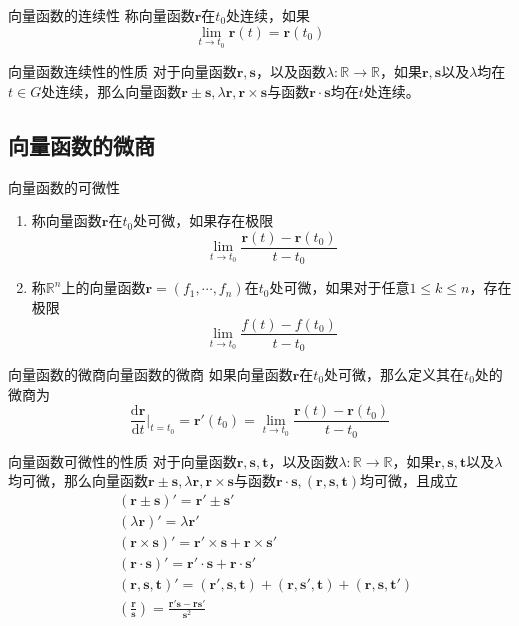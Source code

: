 \documentclass[lang = cn, scheme = chinese, thmcnt = section]{elegantbook}
\newcommand{\R}{\mathbb{R}}            %
\newcommand{\bs}{\boldsymbol}          %
\newcommand{\dd}{\mathrm{d}}           %
\begin{document}
\begin{definition}{向量函数的连续性}
	称向量函数$\bs{r}$在$t_0$处连续，如果
	$$
	\lim_{t\to t_0}\bs{r}(t)=\bs{r}(t_0)
	$$
\end{definition}

\begin{proposition}{向量函数连续性的性质}
	对于向量函数$\bs{r},\bs{s}$，以及函数$\lambda:\R\to\R$，如果$\bs{r},\bs{s}$以及$\lambda$均在$t\in G$处连续，那么向量函数$\bs{r}\pm\bs{s},\lambda \bs{r},\bs{r}\times\bs{s}$与函数$\bs{r}\cdot\bs{s}$均在$t$处连续。
\end{proposition}

\subsection{向量函数的微商}

\begin{definition}{向量函数的可微性}
	\begin{enumerate}
		\item 称向量函数$\bs{r}$在$t_0$处可微，如果存在极限
		$$
		\lim_{t\to t_0}\frac{\bs{r}(t)-\bs{r}(t_0)}{t-t_0}
		$$
		\item 称$\R^n$上的向量函数$\bs{r}=(f_1,\cdots,f_n)$在$t_0$处可微，如果对于任意$1\le k \le n$，存在极限
		$$
		\lim_{t\to t_0}\frac{f(t)-f(t_0)}{t-t_0}
		$$
	\end{enumerate}
\end{definition}

\begin{definition}{向量函数的微商}{向量函数的微商}
	如果向量函数$\bs{r}$在$t_0$处可微，那么定义其在$t_0$处的微商为
	$$
	\frac{\dd \bs{r}}{\dd t}\bigg|_{t=t_0}
	=\bs{r}'(t_0)
	=\lim_{t\to t_0}\frac{\bs{r}(t)-\bs{r}(t_0)}{t-t_0}
	$$
\end{definition}

\begin{proposition}{向量函数可微性的性质}
	对于向量函数$\bs{r},\bs{s},\bs{t}$，以及函数$\lambda:\R\to\R$，如果$\bs{r},\bs{s},\bs{t}$以及$\lambda$均可微，那么向量函数$\bs{r}\pm\bs{s},\lambda \bs{r},\bs{r}\times\bs{s}$与函数$\bs{r}\cdot\bs{s},(\bs{r},\bs{s},\bs{t})$均可微，且成立
	\begin{align*}
		& (\bs{r}\pm\bs{s})'=\bs{r}'\pm\bs{s}'\\
		& (\lambda \bs{r})'=\lambda \bs{r}'\\
		& (\bs{r}\times\bs{s})'=\bs{r}'\times\bs{s}+\bs{r}\times\bs{s}'\\
		& (\bs{r}\cdot\bs{s})'=\bs{r}'\cdot\bs{s}+\bs{r}\cdot\bs{s}'\\
		& (\bs{r},\bs{s},\bs{t})'=(\bs{r}',\bs{s},\bs{t})+(\bs{r},\bs{s}',\bs{t})+(\bs{r},\bs{s},\bs{t}')\\
		& \left(\frac{\bs{r}}{\bs{s}}\right)=\frac{\bs{r}'\bs{s}-\bs{r}\bs{s}'}{\bs{s}^2}
	\end{align*}
\end{proposition}
\end{document}

